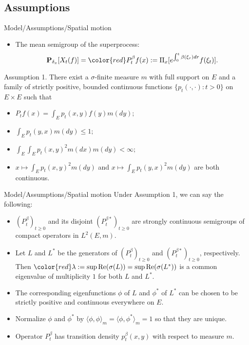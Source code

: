 \documentclass[xcolor=dvipsnames]{beamer}
\begin{document}
\subsection{Assumptions}
\begin{frame}{Model/Assumptions/Spatial motion}
  \begin{itemize}
  \item
    The mean semigroup of the superprocess:
    \[
      \mathbf P_{\delta_x} [X_t(f)] = {\color{red} P_t^\beta} f(x) := \Pi_x[e^{\int_0^{t} \beta (\xi_r) dr}f(\xi_t)].
    \]
  \end{itemize}
  \begin{block}{Assumption 1.}   
    There exist a $\sigma$-finite measure {\color{red} $m$} with full support on $E$ and a family of strictly positive,
    bounded continuous functions $\{ p_t(\cdot,\cdot): t > 0 \}$ on $E \times E$ such that
    \begin{itemize}
    \item $P_tf(x)= \int_E p_t(x,y) f(y) m(dy);$
    \item $\int_E p_t(y,x)m(dy) \leq 1;$
    \item $\int_E \int_E p_t(x,y)^2 m(dx) m(dy)
      <\infty;$
    \item
      $x \mapsto \int_E p_t(x,y)^2 m(dy)$ and $x \mapsto \int_E p_t(y,x)^2 m(dy)$ are both continuous.
    \end{itemize}
  \end{block}
\end{frame}

\begin{frame}{Model/Assumptions/Spatial motion}
  Under Assumption 1, we can say the following:
  \begin{itemize}
  \item
    $(P^\beta_t)_{t \geq 0}$ and its disjoint $(P^{\beta *}_t)_{t \geq 0}$ are strongly continuous semigroups of compact operators in $L^2(E,m)$.
  \item
    Let $L$ and $L^*$ be the generators of $(P^\beta_t)_{t \geq 0}$ and $(P^{\beta *}_t)_{t \geq 0}$, respectively. 
    Then ${\color{red} \lambda} := \sup \text{Re}(\sigma(L)) = \sup \text{Re}(\sigma(L^*))$ is a common {\color{red}eigenvalue} of multiplicity $1$ for both $L$ and $L^*$.
  \item
    The corresponding {\color{red}eigenfunctions} {\color{red} $\phi$} of $L$ and {\color{red} $\phi^*$} of $L^*$ can be chosen to be strictly positive and continuous everywhere on $E$.
  \item
    Normalize $\phi$ and $\phi^*$ by $\langle\phi, \phi\rangle_m = \langle\phi,\phi^*\rangle_m = 1$ so that they are unique.
  \item
    Operator $P_t^\beta$ has transition density {\color{red}$p_t^\beta(x,y)$} with respect to measure $m$.
  \end{itemize}
\end{frame}
\end{document}
